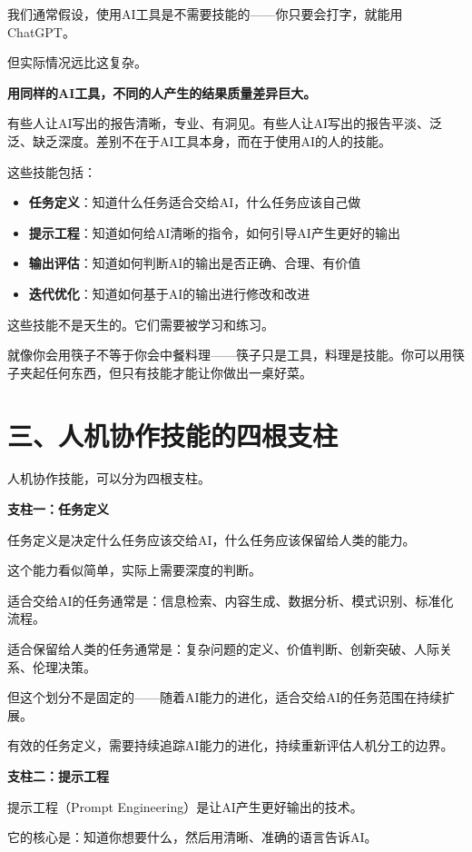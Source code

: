 我们通常假设，使用AI工具是不需要技能的——你只要会打字，就能用ChatGPT。

但实际情况远比这复杂。

\textbf{用同样的AI工具，不同的人产生的结果质量差异巨大。}

有些人让AI写出的报告清晰，专业、有洞见。有些人让AI写出的报告平淡、泛泛、缺乏深度。差别不在于AI工具本身，而在于使用AI的人的技能。

这些技能包括：

\begin{itemize}
\item \textbf{任务定义}：知道什么任务适合交给AI，什么任务应该自己做
\item \textbf{提示工程}：知道如何给AI清晰的指令，如何引导AI产生更好的输出
\item \textbf{输出评估}：知道如何判断AI的输出是否正确、合理、有价值
\item \textbf{迭代优化}：知道如何基于AI的输出进行修改和改进

\end{itemize}
这些技能不是天生的。它们需要被学习和练习。

就像你会用筷子不等于你会中餐料理——筷子只是工具，料理是技能。你可以用筷子夹起任何东西，但只有技能才能让你做出一桌好菜。

\section{三、人机协作技能的四根支柱}


人机协作技能，可以分为四根支柱。

\textbf{支柱一：任务定义}

任务定义是决定什么任务应该交给AI，什么任务应该保留给人类的能力。

这个能力看似简单，实际上需要深度的判断。

适合交给AI的任务通常是：信息检索、内容生成、数据分析、模式识别、标准化流程。

适合保留给人类的任务通常是：复杂问题的定义、价值判断、创新突破、人际关系、伦理决策。

但这个划分不是固定的——随着AI能力的进化，适合交给AI的任务范围在持续扩展。

有效的任务定义，需要持续追踪AI能力的进化，持续重新评估人机分工的边界。

\textbf{支柱二：提示工程}

提示工程（Prompt Engineering）是让AI产生更好输出的技术。

它的核心是：知道你想要什么，然后用清晰、准确的语言告诉AI。

